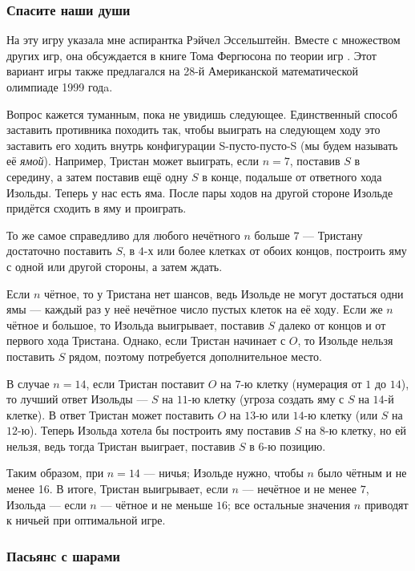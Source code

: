 \subsubsection*{Спасите наши души}

На эту игру указала мне аспирантка Рэйчел Эссельштейн.
Вместе с множеством других игр, она обсуждается в книге Тома Фергюсона по теории игр \cite{ferguson}.
Этот вариант игры также предлагался на 28-й Американской математической олимпиаде 1999 годa.

Вопрос кажется туманным, пока не увидишь следующее.
Единственный способ заставить противника походить так, чтобы выиграть на следующем ходу это заставить его ходить внутрь конфигурации S-пусто-пусто-S (мы будем называть её \emph{ямой}).
Например, Тристан может выиграть, если $n = 7$, поставив $S$ в середину, а затем поставив ещё одну $S$ в конце, подальше от ответного хода Изольды.
Теперь у нас есть яма.
После пары ходов на другой стороне Изольде придётся сходить в яму и проиграть.

То же самое справедливо для любого нечётного $n$ больше $7$ --- Тристану достаточно поставить $S$, в $4$-х или более клетках от обоих концов, построить яму с одной или другой стороны, а затем ждать.

Если $n$ чётное, то у Тристана нет шансов, ведь Изольде не могут достаться одни ямы --- каждый раз у неё нечётное число пустых клеток на её ходу.
Если же $n$ чётное и большое, то Изольда выигрывает, поставив $S$ далеко от концов и от первого хода Тристана.
Однако, если Тристан начинает с $O$, то Изольде нельзя поставить $S$ рядом, поэтому потребуется дополнительное место.

В случае $n = 14$, если Тристан поставит $O$ на $7$-ю клетку (нумерация от $1$ до $14$), то лучший ответ Изольды --- $S$ на $11$-ю клетку (угроза создать яму с $S$ на $14$-й клетке).
В ответ Тристан может поставить $O$ на $13$-ю или $14$-ю клетку (или $S$ на $12$-ю). 
Теперь Изольда хотела бы построить яму поставив $S$ на $8$-ю клетку, но ей нельзя, ведь тогда Тристан выиграет, поставив $S$ в $6$-ю позицию.

Таким образом, при $n = 14$ --- ничья;
Изольде нужно, чтобы $n$ было чётным и не менее 16.
В итоге, Тристан выигрывает, если $n$ --- нечётное и не менее $7$,
Изольда --- если $n$ --- чётное и не меньше $16$;
все остальные значения $n$ приводят к ничьей при оптимальной игре.

\subsubsection*{Пасьянс с шарами}

